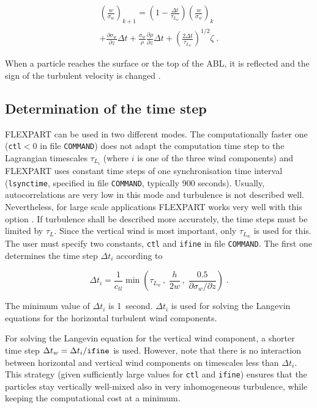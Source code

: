 \documentclass{egu}                  %
\begin{document}
\begin{multline}
\left (\frac{w}{\sigma_w} \right)_{k+1}=
\left (1-\frac{\Delta t}{\tau_{L_w}} \right )\left (\frac{w}{\sigma_w} \right)_k\\
+ \frac{\partial \sigma_w}{\partial z} \Delta t
+ \frac{\sigma_w}{\rho} \frac{\partial \rho}{\partial z} \Delta t
+ \left( \frac{2 \Delta t}{\tau_{L_w}} \right)^{1/2} \zeta \;.
\end{multline}

When a particle reaches the surface or the top of the ABL, it is reflected and
the sign of the turbulent velocity is changed \citep{wilson1993}.

\subsection{\label{timestep}Determination of the time step}

FLEXPART can be used in two different modes.  The computationally faster one
(\verb|ctl|$<$0 in file \verb|COMMAND|) does not adapt the computation time
step to the Lagrangian timescales $\tau_{L_i}$ (where $i$ is one of the three
wind components) and FLEXPART uses constant time steps of one synchronisation
time interval (\verb|lsynctime|, specified in file \verb|COMMAND|, typically
900 seconds).  Usually, autocorrelations are very low in this mode and
turbulence is not described well.  Nevertheless, for large scale applications
FLEXPART works very well with this option \citep{stohletal1998}.  If turbulence
shall be described more accurately, the time steps must be limited by $\tau_L$.
Since the vertical wind is most important, only $\tau_{L_w}$ is used for this.
The user must specify two constants, \verb|ctl| and \verb|ifine| in file
\verb|COMMAND|.  The first one determines the time step $\Delta t_i$ according
to

\begin{equation}
\Delta t_i=\frac{1}{c_{tl}} \min \left ({\tau_{L_w}\, , \; \frac{h}{2w}\, , \; \frac{0.5}{\partial \sigma_w / \partial z}} \right ) \;.
\end{equation}

The minimum value of $\Delta t_i$ is 1~second.
$\Delta t_i$ is used for solving the Langevin equations for the horizontal turbulent wind components.

For solving the Langevin equation for the vertical wind component, a shorter
time step $\Delta t_w=\Delta t_i / \verb|ifine|$ is used.  However, note that
there is no interaction between horizontal and vertical wind components on
timescales less than $\Delta t_i$.  This strategy (given sufficiently large
values for \verb|ctl| and \verb|ifine|) ensures that the particles stay
vertically well-mixed also in very inhomogeneous turbulence, while keeping the
computational cost at a minimum.
\end{document}
